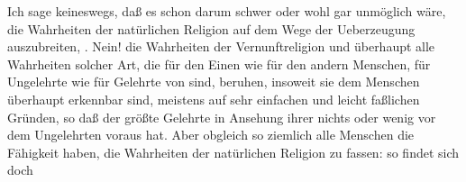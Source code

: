Ich sage keineswegs, daß es schon darum schwer oder wohl gar unmöglich wäre, die Wahrheiten der natürlichen Religion auf dem Wege der Ueberzeugung auszubreiten, . Nein! die Wahrheiten der Vernunftreligion und überhaupt alle Wahrheiten solcher Art, die für den Einen wie für den andern Menschen, für Ungelehrte wie für Gelehrte von  sind, beruhen, insoweit sie dem Menschen überhaupt erkennbar sind, meistens auf sehr einfachen und leicht faßlichen Gründen, so daß der größte Gelehrte in Ansehung ihrer nichts oder wenig vor dem Ungelehrten voraus hat. Aber obgleich so ziemlich alle Menschen die Fähigkeit haben, die Wahrheiten der natürlichen Religion zu fassen: so findet sich doch

